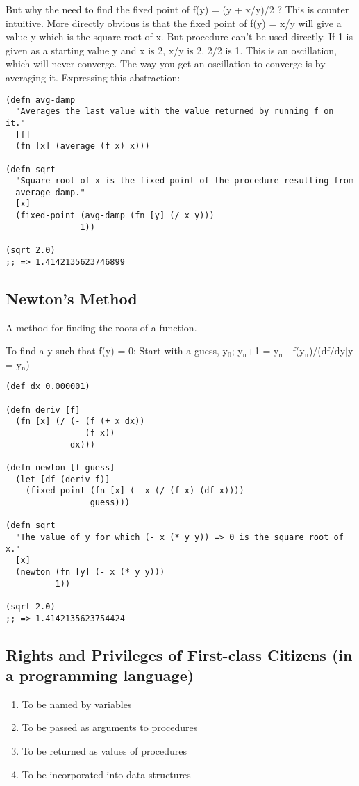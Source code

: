 \documentclass[11pt]{article}
\begin{document}
But why the need to find the fixed point of f(y) = (y + x/y)/2 ? This is counter intuitive. More directly obvious is that the fixed point of f(y) = x/y will give a value y which is the square root of x. But procedure can't be used directly. If 1 is given as a starting value y and x is 2, x/y is 2. 2/2 is 1. This is an oscillation, which will never converge. The way you get an oscillation to converge is by averaging it. Expressing this abstraction:

\begin{verbatim}
(defn avg-damp
  "Averages the last value with the value returned by running f on it."
  [f]
  (fn [x] (average (f x) x)))

(defn sqrt
  "Square root of x is the fixed point of the procedure resulting from
  average-damp."
  [x]
  (fixed-point (avg-damp (fn [y] (/ x y)))
               1))

(sqrt 2.0)
;; => 1.4142135623746899
\end{verbatim}

\subsection{Newton's Method}
\label{sec-3-2}
A method for finding the roots of a function.

To find a y such that f(y) = 0:
Start with a guess, y$_{\text{0}}$;
y$_{\text{n}}$+1 = y$_{\text{n}}$ - f(y$_{\text{n}}$)/(df/dy|y = y$_{\text{n}}$)

\begin{verbatim}
(def dx 0.000001)

(defn deriv [f]
  (fn [x] (/ (- (f (+ x dx))
                (f x))
             dx)))

(defn newton [f guess]
  (let [df (deriv f)]
    (fixed-point (fn [x] (- x (/ (f x) (df x))))
                 guess)))

(defn sqrt
  "The value of y for which (- x (* y y)) => 0 is the square root of x."
  [x]
  (newton (fn [y] (- x (* y y)))
          1))

(sqrt 2.0)
;; => 1.4142135623754424
\end{verbatim}

\subsection{Rights and Privileges of First-class Citizens (in a programming language)}
\label{sec-3-3}
\begin{enumerate}
\item To be named by variables
\item To be passed as arguments to procedures
\item To be returned as values of procedures
\item To be incorporated into data structures
\end{enumerate}
\end{document}
